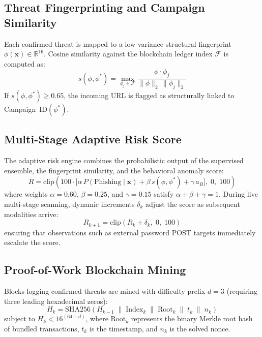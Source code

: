 \documentclass[conference]{IEEEtran}
\begin{document}
\subsection{Threat Fingerprinting and Campaign Similarity}
Each confirmed threat is mapped to a low-variance structural fingerprint $\phi(\mathbf{x}) \in \mathbb{R}^{16}$.
Cosine similarity against the blockchain ledger index $\mathcal{F}$ is computed as:
\begin{equation}
  s(\phi, \phi^*) = \max_{\phi_j \in \mathcal{F}} \frac{\phi \cdot \phi_j}{\|\phi\|_2\,\|\phi_j\|_2}
  \label{eq:sim}
\end{equation}
If $s(\phi, \phi^*) \ge 0.65$, the incoming URL is flagged as structurally linked to Campaign~$\text{ID}(\phi^*)$.

\subsection{Multi-Stage Adaptive Risk Score}
The adaptive risk engine combines the probabilistic output of the supervised ensemble, the fingerprint
similarity, and the behavioral anomaly score:
\begin{equation}
  R = \mathrm{clip}\!\left(100 \cdot \bigl[\alpha\,P(\text{Phishing}\mid\mathbf{x}) +
       \beta\,s(\phi, \phi^*) + \gamma\,a_B\bigr],\; 0,\; 100\right)
  \label{eq:risk}
\end{equation}
where weights $\alpha=0.60$, $\beta=0.25$, and $\gamma=0.15$ satisfy $\alpha+\beta+\gamma=1$.
During live multi-stage scanning, dynamic increments $\delta_k$ adjust the score as subsequent
modalities arrive:
\begin{equation}
  R_{k+1} = \mathrm{clip}\!\left(R_k + \delta_k,\; 0,\; 100\right)
  \label{eq:adapt}
\end{equation}
ensuring that observations such as external password POST targets immediately escalate the score.

\subsection{Proof-of-Work Blockchain Mining}
Blocks logging confirmed threats are mined with difficulty prefix $d=3$ (requiring three leading hexadecimal zeros):
\begin{equation}
  H_k = \mathrm{SHA256}\!\left(H_{k-1} \;\|\; \mathrm{Index}_k \;\|\; \mathrm{Root}_k \;\|\; t_k \;\|\; n_k\right)
  \label{eq:chain}
\end{equation}
subject to $H_k < 16^{(64-d)}$, where $\mathrm{Root}_k$ represents the binary Merkle root hash of bundled
transactions, $t_k$ is the timestamp, and $n_k$ is the solved nonce.
\end{document}
